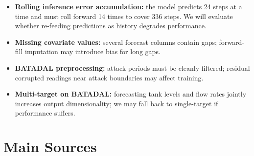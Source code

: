 \documentclass[11pt,a4paper]{article}
\begin{document}
\begin{itemize}
  \setlength\itemsep{0pt}
  \item \textbf{Rolling inference error accumulation:} the model predicts 24
        steps at a time and must roll forward 14 times to cover 336 steps.
        We will evaluate whether re-feeding predictions as history degrades
        performance.
  \item \textbf{Missing covariate values:} several forecast columns contain
        gaps; forward-fill imputation may introduce bias for long gaps.
  \item \textbf{BATADAL preprocessing:} attack periods must be cleanly
        filtered; residual corrupted readings near attack boundaries may affect
        training.
  \item \textbf{Multi-target on BATADAL:} forecasting tank levels and flow
        rates jointly increases output dimensionality; we may fall back to
        single-target if performance suffers.
\end{itemize}

\section*{Main Sources}

\begingroup
\renewcommand{\section}[2]{}


\endgroup
\end{document}
